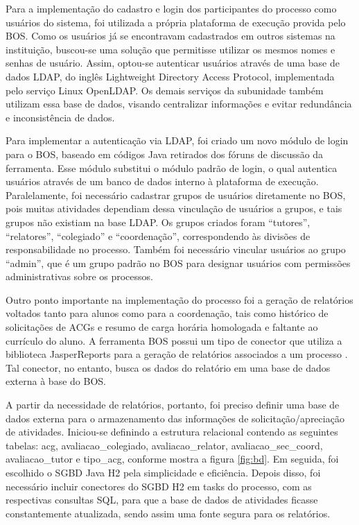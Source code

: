 \documentclass[12pt]{article}
\begin{document}
Para a implementação do cadastro e login dos participantes do processo como usuários do sistema, foi utilizada a própria plataforma de execução provida pelo BOS. Como os usuários já se encontravam cadastrados em outros sistemas na instituição, buscou-se uma solução que permitisse utilizar os mesmos nomes e senhas de usuário. Assim, optou-se autenticar usuários através de uma base de dados LDAP, do inglês Lightweight Directory Access Protocol, implementada pelo serviço Linux OpenLDAP. Os demais serviços da subunidade também utilizam essa base de dados, visando centralizar informações e evitar redundância e inconsistência de dados.

Para implementar a autenticação via LDAP, foi criado um novo módulo de login para o BOS, baseado em códigos Java retirados dos fóruns de discussão da ferramenta. Esse módulo substitui o módulo padrão de login, o qual autentica usuários através de um banco de dados interno à plataforma de execução. Paralelamente, foi necessário cadastrar grupos de usuários diretamente no BOS, pois muitas atividades dependiam dessa vinculação de usuários a grupos, e tais grupos não existiam na base LDAP. Os grupos criados foram “tutores”, “relatores”, “colegiado” e “coordenação”, correspondendo às divisões de responsabilidade no processo. Também foi necessário vincular usuários ao grupo “admin”, que é um grupo padrão no BOS para designar usuários com permissões administrativas sobre os processos.

Outro ponto importante na implementação do processo foi a geração de relatórios voltados tanto para alunos como para a coordenação, tais como histórico de solicitações de ACGs e resumo de carga horária homologada e faltante ao currículo do aluno. A ferramenta BOS possui um tipo de conector que utiliza a biblioteca JasperReports para a geração de relatórios associados a um processo \cite{JASPERSOFT}. Tal conector, no entanto, busca os dados do relatório em uma base de dados externa à base do BOS.

A partir da necessidade de relatórios, portanto, foi preciso definir uma base de dados externa para o armazenamento das informações de solicitação/apreciação de atividades. Iniciou-se definindo a estrutura relacional contendo as seguintes tabelas: acg, avaliacao\_colegiado, avaliacao\_relator, avaliacao\_sec\_coord, avaliacao\_tutor e tipo\_acg, conforme mostra a figura \ref{fig:bd}. Em seguida, foi escolhido o SGBD Java H2 pela simplicidade e eficiência. Depois disso, foi necessário incluir conectores do SGBD H2 em tasks do processo, com as respectivas consultas SQL, para que a base de dados de atividades ficasse constantemente atualizada, sendo assim uma fonte segura para os relatórios.
\end{document}
